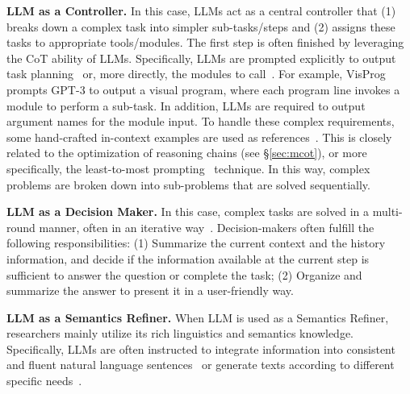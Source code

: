 \noindent \textbf{LLM as a Controller.}
In this case, LLMs act as a central controller that (1) breaks down a complex task into simpler sub-tasks/steps and (2) assigns these tasks to appropriate tools/modules. The first step is often finished by leveraging the CoT ability of LLMs. Specifically, LLMs are prompted explicitly to output task planning~\cite{HuggingGPT} or, more directly, the modules to call~\cite{chameleon, gpt4tools, visprog}. For example, VisProg~\cite{visprog} prompts GPT-3 to output a visual program, where each program line invokes a module to perform a sub-task.
In addition, LLMs are required to output argument names for the module input. 
To handle these complex requirements, some hand-crafted in-context examples are used as references~\cite{chameleon, HuggingGPT, visprog}.
This is closely related to the optimization of reasoning chains (see \S \ref{sec:mcot}), or more specifically, the least-to-most prompting~\cite{zhou2022least} technique.
In this way, complex problems are broken down into sub-problems that are solved sequentially.

\noindent \textbf{LLM as a Decision Maker.}
In this case, complex tasks are solved in a multi-round manner, often in an iterative way~\cite{idealgpt}. 
Decision-makers often fulfill the following responsibilities: 
(1) Summarize the current context and the history information, and decide if the information available at the current step is sufficient to answer the question or complete the task; (2) Organize and summarize the answer to present it in a user-friendly way.

\noindent \textbf{LLM as a Semantics Refiner.}
When LLM is used as a Semantics Refiner, researchers mainly utilize its rich linguistics and semantics knowledge. 
Specifically, LLMs are often instructed to integrate information into consistent and fluent natural language sentences~\cite{SMs} or generate texts according to different specific needs~\cite{CAT, PointCLIP-V2, CaFo}.



